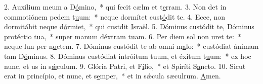 2. Auxílium meum a D\uline{ó}mino,~* qui fecit cælm et t\uline{e}rram.
3. Non det in commotiónem pedem t\uline{u}um:~* neque dormítet  cust\uline{ó}dit te.
4. Ecce, non dormitábit neque d\uline{ó}rmiet,~* qui custdit \uline{I}sraël.
5. Dóminus custódit te, Dóminus protéctio t\uline{u}a,~* super manum déxtram t\uline{u}am.
6. Per diem sol non \uline{u}ret te:~* neque lun per n\uline{o}ctem.
7. Dóminus custódit te ab omni m\uline{a}lo:~* custódiat ánimam tam D\uline{ó}minus.
8. Dóminus custódiat intróitum tuum, et éxitum t\uline{u}um:~* ex hoc nunc, et us in s\uline{ǽ}culum.
9. Glória Patri, et F\uline{í}lio,~* et Spiríti S\uline{a}ncto.
10. Sicut erat in princípio, et nunc, et s\uline{e}mper,~* et in sǽcula sæculrum. \uline{A}men.
